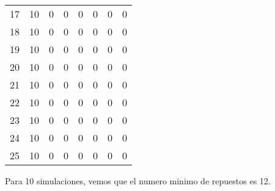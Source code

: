 \begin{table}[h]
{\begin{tabular}{|c|c|c|c|c|c|c|c|}
17 & 10 & 0 & 0 & 0 & 0 & 0 & 0 \\
18 & 10 & 0 & 0 & 0 & 0 & 0 & 0 \\
19 & 10 & 0 & 0 & 0 & 0 & 0 & 0 \\
20 & 10 & 0 & 0 & 0 & 0 & 0 & 0 \\
21 & 10 & 0 & 0 & 0 & 0 & 0 & 0 \\
22 & 10 & 0 & 0 & 0 & 0 & 0 & 0 \\
23 & 10 & 0 & 0 & 0 & 0 & 0 & 0 \\
24 & 10 & 0 & 0 & 0 & 0 & 0 & 0 \\
25 & 10 & 0 & 0 & 0 & 0 & 0 & 0 \\ \hline
\end{tabular}%
}
\end{table}

Para 10 simulaciones, vemos que el numero minimo de repuestos es 12.

